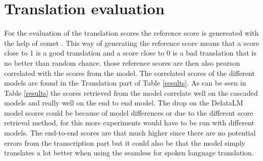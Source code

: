 \section{Translation evaluation}
For the evaluation of the translation scores the reference score is genereated with the help of comet \cite{rei-etal-2020-comet}. This way of generating the reference score means that a score close to 1 is a good translation and a score close to 0 is a bad translation that is no better than random chance.
those reference scores are then also pearson correlated with the scores from the model. The correlated scores of the different models are found in the Translation part of Table \autoref{results}. 
As can be seen in Table \autoref{results} the scores retrieved from the model correlate well on the cascaded models and really well on the end to end model. The drop on the DelataLM model scores could be because of model differences or due to the different score retrieval method, for this more experiments would have to be run with different models. The end-to-end scores are that much higher since there are no potential errors from the transcription part but it could also be that the model simply translates a lot better when using the seamless for spoken language translation. 

